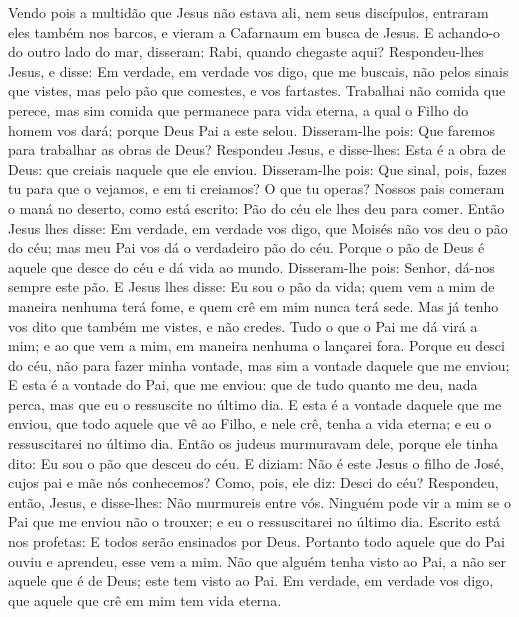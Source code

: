 {Vendo pois a multidão que Jesus não estava ali, nem seus discípulos, entraram eles também nos barcos, e vieram a Cafarnaum em busca de Jesus.
E achando-o do outro lado do mar, disseram: Rabi, quando chegaste aqui?
Respondeu-lhes Jesus, e disse: Em verdade, em verdade vos digo, que me buscais, não pelos sinais que vistes, mas pelo pão que comestes, e vos fartastes.
Trabalhai não
{} comida que perece, mas sim
{} comida que permanece para vida eterna, a qual o Filho do homem vos dará; porque Deus Pai a este selou.
Disseram-lhe pois: Que faremos para trabalhar as obras de Deus?
Respondeu Jesus, e disse-lhes: Esta é a obra de Deus: que creiais naquele que ele enviou.
Disseram-lhe pois: Que sinal, pois, fazes tu para que o vejamos, e em ti creiamos? O que tu operas?
Nossos pais comeram o maná no deserto, como está escrito: Pão do céu ele lhes deu para comer.
Então Jesus lhes disse: Em verdade, em verdade vos digo, que Moisés não vos deu o pão do céu; mas meu Pai vos dá o verdadeiro pão do céu.
Porque o pão de Deus é aquele que desce do céu e dá vida ao mundo.
Disseram-lhe pois: Senhor, dá-nos sempre
{} este pão.
E Jesus lhes disse: Eu sou o pão da vida; quem vem a mim de maneira nenhuma terá fome, e quem crê em mim nunca terá sede.
Mas já tenho vos dito que também me vistes, e não credes.
Tudo o que o Pai me dá virá a mim; e ao que vem a mim, em maneira nenhuma o lançarei fora.
Porque eu desci do céu, não para fazer minha vontade, mas sim a vontade daquele que me enviou;
E esta é a vontade do Pai, que me enviou: que de tudo quanto me deu, nada perca, mas que eu o ressuscite no último dia.
E esta é a vontade daquele que me enviou, que todo aquele que vê ao Filho, e nele crê, tenha a vida eterna; e eu o ressuscitarei no último dia.
Então os judeus murmuravam dele, porque ele tinha dito: Eu sou o pão que desceu do céu.
E diziam: Não é este Jesus o filho de José, cujos pai e mãe nós conhecemos? Como, pois, ele diz: Desci do céu?
Respondeu, então, Jesus, e disse-lhes: Não murmureis entre vós.
Ninguém pode vir a mim se o Pai que me enviou não o trouxer; e eu o ressuscitarei no último dia.
Escrito está nos profetas: E todos serão ensinados por Deus. Portanto todo aquele que do Pai ouviu e aprendeu, esse vem a mim.
Não que alguém tenha visto ao Pai, a não ser aquele que é de Deus; este tem visto ao Pai.
Em verdade, em verdade vos digo, que aquele que crê em mim tem vida eterna.
}
